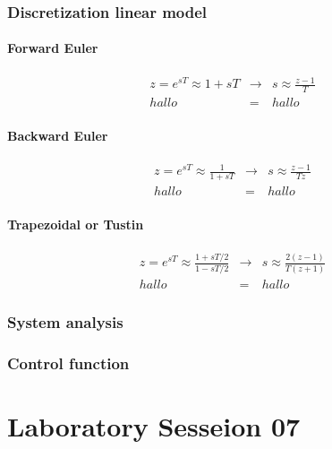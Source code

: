 \section{Discretization linear model}

	\subsection{Forward Euler}
	
		\begin{eqnarray}
			z = e^{sT} \approx 1 + sT &\rightarrow& s \approx \frac{z - 1}{T}\\
			hallo &=& hallo
		\end{eqnarray}
	
	\subsection{Backward Euler}
		
		\begin{eqnarray}
			z = e^{sT} \approx \frac{1}{1 + sT} &\rightarrow& s \approx \frac{z - 1}{Tz}\\
			hallo &=& hallo
		\end{eqnarray}
	
	\subsection{Trapezoidal or Tustin}
	
		\begin{eqnarray}
			z = e^{sT} \approx \frac{1 + sT/2}{1 - sT/2} &\rightarrow& s \approx \frac{2\left( z - 1\right) }{T\left( z+1\right) }\\
			hallo &=& hallo
		\end{eqnarray}

\section{System analysis}


\section{Control function}

\part{Laboratory Sesseion 07}


